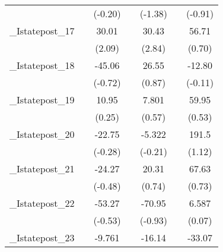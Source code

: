 {\begin{tabular}{l*{6}{c}}
            &                     &     (-0.20)         &                     &     (-1.38)         &                     &     (-0.91)         \\
[1em]
\_Istatepost\_17&                     &       30.01\sym{*}  &                     &       30.43\sym{**} &                     &       56.71         \\
            &                     &      (2.09)         &                     &      (2.84)         &                     &      (0.70)         \\
[1em]
\_Istatepost\_18&                     &      -45.06         &                     &       26.55         &                     &      -12.80         \\
            &                     &     (-0.72)         &                     &      (0.87)         &                     &     (-0.11)         \\
[1em]
\_Istatepost\_19&                     &       10.95         &                     &       7.801         &                     &       59.95         \\
            &                     &      (0.25)         &                     &      (0.57)         &                     &      (0.53)         \\
[1em]
\_Istatepost\_20&                     &      -22.75         &                     &      -5.322         &                     &       191.5         \\
            &                     &     (-0.28)         &                     &     (-0.21)         &                     &      (1.12)         \\
[1em]
\_Istatepost\_21&                     &      -24.27         &                     &       20.31         &                     &       67.63         \\
            &                     &     (-0.48)         &                     &      (0.74)         &                     &      (0.73)         \\
[1em]
\_Istatepost\_22&                     &      -53.27         &                     &      -70.95         &                     &       6.587         \\
            &                     &     (-0.53)         &                     &     (-0.93)         &                     &      (0.07)         \\
[1em]
\_Istatepost\_23&                     &      -9.761         &                     &      -16.14         &                     &      -33.07         \\

\end{tabular}}

